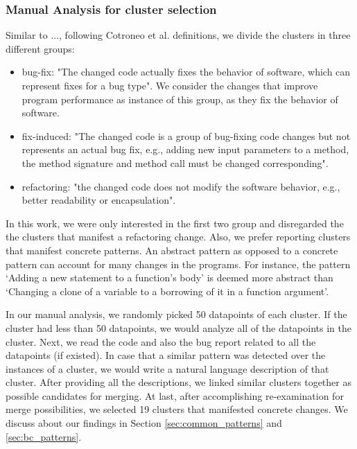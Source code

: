 \subsubsection{\label{sec:manual_analysis_cluster_selection}Manual Analysis for cluster selection}

Similar to ..., following Cotroneo et al. definitions, we divide the clusters in three different groups:

\begin{itemize}
    \item bug-fix: "The changed code actually fixes the behavior of software, which can represent fixes for a bug type". We consider the changes that improve program performance as instance of this group, as they fix the behavior of software.
    
    \item fix-induced: "The changed code is a group of bug-fixing code changes but not represents an actual bug fix, e.g., adding new input parameters to a method, the method signature and method call must be changed corresponding".
    
    \item refactoring: "the changed code does not modify the software behavior, e.g., better readability or encapsulation".
\end{itemize}

In this work, we were only interested in the first two group and disregarded the the clusters that manifest a refactoring change. Also, we prefer reporting clusters that manifest concrete patterns. An abstract pattern as opposed to a concrete pattern can account for many changes in the programs. For instance, the pattern `Adding a new statement to a function's body' is deemed more abstract than `Changing a clone of a variable to a borrowing of it in a function argument'.

In our manual analysis, we randomly picked 50 datapoints of each cluster. If the cluster had less than 50 datapoints, we would analyze all of the datapoints in the cluster. Next, we read the code and also the bug report related to all the datapoints (if existed). In case that a similar pattern was detected over the instances of a cluster, we would write a natural language description of that cluster. After providing all the descriptions, we linked similar clusters together as possible candidates for merging. At last, after accomplishing re-examination for merge possibilities, we selected 19 clusters that manifested concrete changes. We discuss about our findings in Section \ref{sec:common_patterns} and \ref{sec:bc_patterns}.




